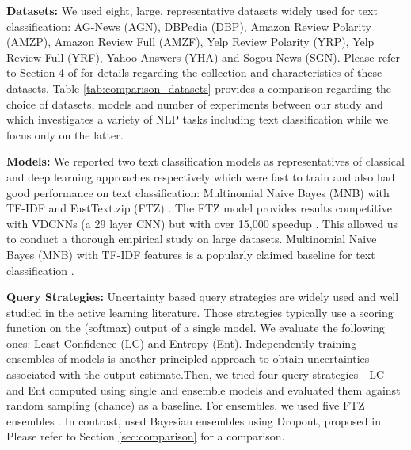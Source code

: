 \documentclass[11pt,a4paper]{article}
\begin{document}
\textbf{Datasets:} We used eight, large, representative datasets widely used for text classification: AG-News (AGN), DBPedia (DBP), Amazon Review Polarity (AMZP), Amazon Review Full (AMZF), Yelp Review Polarity (YRP), Yelp Review Full (YRF), Yahoo Answers (YHA) and Sogou News (SGN). Please refer to Section 4 of \cite{zhang2015character} for details regarding the collection and characteristics of these datasets. Table \ref{tab:comparison_datasets} provides a comparison regarding the choice of datasets, models and number of experiments between our study and \cite{siddhant2018deep} which investigates a variety of NLP tasks including text classification while we focus only on the latter.

\textbf{Models:} We reported two text classification models as representatives of classical and deep learning approaches respectively which were fast to train and also had good performance on text classification:  Multinomial Naive Bayes (MNB) with TF-IDF \cite{wang2012baselines} and FastText.zip (FTZ) \cite{joulin2016fasttext}. The FTZ model provides results competitive with VDCNNs (a 29 layer CNN) \cite{conneau2016very} but with over 15,000 speedup \cite{joulin2016bag}.  
This allowed us to conduct a thorough empirical study on large datasets. Multinomial Naive Bayes (MNB) with TF-IDF features is a popularly claimed baseline for text classification \cite{wang2012baselines}.



\textbf{Query Strategies:} Uncertainty based query strategies are widely used and well studied in the active learning literature. Those strategies typically use a scoring function on the (softmax) output of a single model. We evaluate the following ones: Least Confidence (LC) and Entropy (Ent). Independently training ensembles of models \cite{lakshminarayanan2017simple} is another principled approach to obtain uncertainties associated with the output estimate.Then, we tried four query strategies - LC and Ent computed using single and ensemble models and evaluated them against random sampling (chance) as a baseline. For ensembles, we used five FTZ ensembles \cite{lakshminarayanan2017simple}. In contrast, \cite{siddhant2018deep} used  Bayesian ensembles using Dropout, proposed in \cite{gal2017deep}. Please refer to Section \ref{sec:comparison} for a comparison.   
\end{document}

